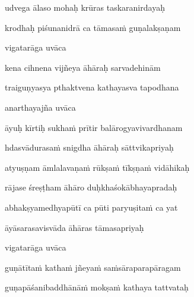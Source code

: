 udvega ālaso mohaḥ krūras taskaranirdayaḥ \danda\dontdisplaylinenum

krodhaḥ piśunanidrā ca tāmasa\.m guṇalakṣaṇam \veg\dontdisplaylinenum

vigatarāga uvāca~{\dandab}\dontdisplaylinenum 

kena cihnena vijñeya āhāraḥ sarvadehinām\thinspace{\danda} \dontdisplaylinenum

traiguṇyasya pthaktvena kathayasva tapodhana \veg\dontdisplaylinenum

anarthayajña uvāca~{\dandab}\dontdisplaylinenum 

āyuḥ kīrtiḥ sukha\.m prītir balārogyavivardhanam\thinspace{\danda} \dontdisplaylinenum

hdasvādurasa\.m snigdha āhāraḥ sāttvikapriyaḥ \veg\dontdisplaylinenum

atyuṣṇam āmlalavaṇa\.m rūkṣa\.m tīkṣṇa\.m vidāhikaḥ\thinspace{\dandab} \dontdisplaylinenum

rājase śreṣṭham āhāro duḥkhaśokābhayapradaḥ \veg\dontdisplaylinenum

abhakṣyamedhyapūtī ca pūti paryuṣita\.m ca yat\thinspace{\dandab} \dontdisplaylinenum

āyāsarasavisvāda āhāras tāmasapriyaḥ \veg\dontdisplaylinenum

vigatarāga uvāca~{\dandab}\dontdisplaylinenum 

guṇātīta\.m katha\.m jñeya\.m sa\.msāraparapāragam\thinspace{\danda} \dontdisplaylinenum

guṇapāśanibaddhānā\.m mokṣa\.m kathaya tattvataḥ \veg\dontdisplaylinenum

